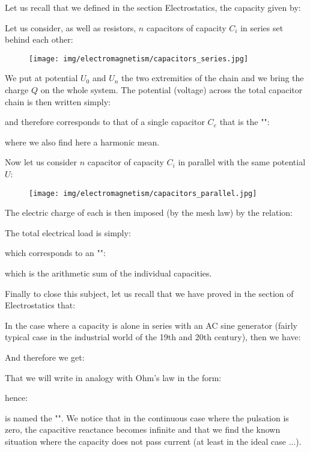	Let us recall that we defined in the section Electrostatics, the capacity given by:
	
	Let us consider, as well as resistors, $n$ capacitors of capacity  $C_i$ in series set behind each other:
	\begin{figure}[H]
		\centering
		\texttt{[image: img/electromagnetism/capacitors\_series.jpg]}
	\end{figure}	
	 We put at potential $U_0$ and $U_n$ the two extremities of the chain and we bring the charge $Q$ on the whole system. The potential (voltage) across the total capacitor chain is then written simply:
	
	and therefore corresponds to that of a single capacitor $C_e$ that is the "":
	
	where we also find here a harmonic mean.
	
	Now let us consider $n$ capacitor of  capacity $C_i$ in parallel with the same potential $U$:
	\begin{figure}[H]
		\centering
		\texttt{[image: img/electromagnetism/capacitors\_parallel.jpg]}
	\end{figure}	
	The electric charge of each is then imposed (by the mesh law) by the relation:
	
	The total electrical load is simply:
	
	which corresponds to an "":
	
	which is the arithmetic sum of the individual capacities.

	Finally to close this subject, let us recall that we have proved in the section of Electrostatics that:
	
	In the case where a capacity is alone in series with an AC sine generator (fairly typical case in the industrial world of the 19th and 20th century), then we have:
	
	And therefore we get:
	
	That we will write in analogy with Ohm's law in the form:
	
	hence:
		
	is named the "". We notice that in the continuous case where the pulsation is zero, the capacitive reactance becomes infinite and that we find the known situation where the capacity does not pass current (at least in the ideal case ...).
	

